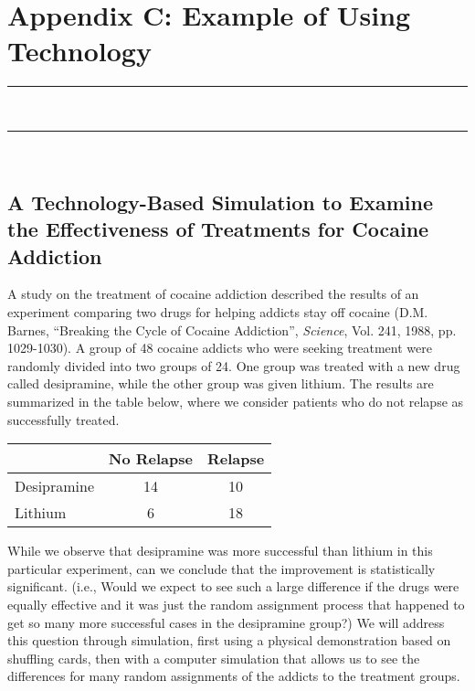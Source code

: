 \chapter{Appendix C: Example of Using Technology}
\vspace{-.53in}
   \noindent\color{graylight}\rule[0cm]{3.25in}{0.03cm} \\
    \noindent\color{graylight}\rule[0.4cm]{3.25in}{0.03cm} \\
\color{black}

\noindent{}

\section{\textbf{A Technology-Based Simulation to Examine the Effectiveness of Treatments for Cocaine Addiction}}
A study on the treatment of cocaine addiction described the results of an experiment comparing two drugs for helping addicts stay off cocaine (D.M. Barnes, ``Breaking the Cycle of Cocaine Addiction'', \textit{Science}, Vol. 241, 1988,  pp. 1029-1030).  A group of 48 cocaine addicts who were seeking treatment were randomly divided into two groups of 24.  One group was treated with a new drug called desipramine, while the other group was given lithium.  The results are summarized in the table below, where we consider patients who do not relapse as successfully treated. 

\begin{table}[!ht]
\begin{center}
\begin{tabular}{|l|c|c|}
\hline
& No Relapse & Relapse\\
\hline
Desipramine & 14 &  10\\
\hline
Lithium & 6 & 18\\
\hline
\end{tabular}
\end{center}
\end{table}

While we observe that desipramine was more successful than lithium in this particular experiment, can we conclude that the improvement is statistically significant. (i.e., Would we expect to see such a large difference if the drugs were equally effective and it was just the random assignment process that happened to get so many more successful cases in the desipramine group?)  We will address this question through simulation, first using a physical demonstration based on shuffling cards, then with a computer simulation that allows us to see the differences for many random assignments of the addicts to the treatment groups. \\
\vspace{12pt}
\newpage

